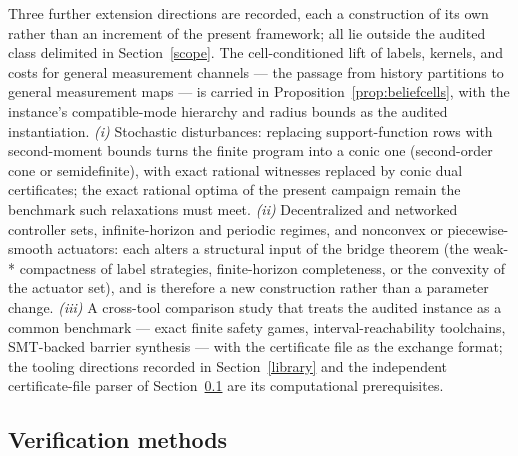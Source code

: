 \documentclass[10pt,twocolumn]{article}
\theoremstyle{plain}
\theoremstyle{definition}
\theoremstyle{remark}
\begin{document}
Three further extension directions are recorded, each a construction of
its own rather than an increment of the present framework; all lie outside
the audited class delimited in Section~\ref{scope}. The cell-conditioned
lift of labels, kernels, and costs for general measurement channels --- the
passage from history partitions to general measurement maps --- is carried
in Proposition~\ref{prop:beliefcells}, with the instance's compatible-mode
hierarchy and radius bounds as the audited instantiation.
\emph{(i)} Stochastic disturbances: replacing support-function rows with
second-moment bounds turns the finite program into a conic one
(second-order cone or semidefinite), with exact rational witnesses
replaced by conic dual certificates; the exact rational optima of the
present campaign remain the benchmark such relaxations must meet.
\emph{(ii)} Decentralized and networked controller sets, infinite-horizon
and periodic regimes, and nonconvex or piecewise-smooth actuators: each
alters a structural input of the bridge theorem (the weak-* compactness
of label strategies, finite-horizon completeness, or the convexity of
the actuator set), and is therefore a new construction rather than a
parameter change.
\emph{(iii)} A cross-tool comparison study that treats the audited
instance as a common benchmark --- exact finite safety games,
interval-reachability toolchains, SMT-backed barrier synthesis --- with
the certificate file as the exchange format; the tooling directions
recorded in Section~\ref{library} and the independent
certificate-file parser of Section~\ref{methods} are its computational
prerequisites.

\subsection{Verification methods}\label{methods}
\end{document}

